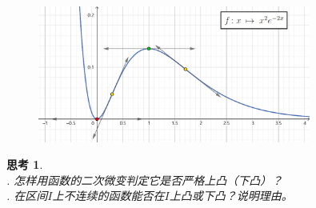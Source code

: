 \documentclass[12pt,UTF8]{ctexbook}
\theoremstyle{definition}
\theoremstyle{plain}
\newtheorem{sk}{思考}[section]
\begin{document}
\begin{figure}[H]
    \centering
    \includegraphics[width=0.8\textwidth]{tu/研究函数2.png}
\end{figure}


\begin{sk}
    \mbox{} \\
    . 怎样用函数的二次微变判定它是否严格上凸（下凸）？\\
    . 在区间$I$上不连续的函数能否在$I$上凸或下凸？说明理由。
\end{sk}
\end{document}
